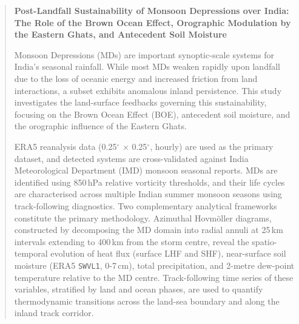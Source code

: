 \begin{abstract}
  \large \textbf{Post-Landfall Sustainability of Monsoon Depressions
    over India: \\
    The Role of the Brown Ocean Effect, %
    Orographic Modulation by the Eastern Ghats, %
  and Antecedent Soil Moisture}

  \vspace{0.5cm}

  \normalsize
  \noindent Monsoon Depressions (MDs) are important synoptic-scale
  systems for India's seasonal rainfall. While most MDs weaken
  rapidly upon landfall due to the loss of oceanic energy and
  increased friction from land interactions, a subset exhibits
  anomalous inland persistence. This study investigates the
  land-surface feedbacks governing this sustainability, focusing on
  the Brown Ocean Effect (BOE), antecedent soil moisture, and the
  orographic influence of the Eastern Ghats.

  \vspace{0.3cm}

  \noindent ERA5 reanalysis data (0.25\(^\circ\) $\times$
  0.25\(^\circ\), hourly) are used as the primary dataset, and
  detected systems are cross-validated against India Meteorological
  Department (IMD) monsoon seasonal reports. MDs are identified using
  850\,hPa relative vorticity thresholds, and their life cycles are
  characterised across multiple Indian summer monsoon seasons using
  track-following diagnostics. Two complementary analytical
  frameworks constitute the primary methodology. Azimuthal
  Hovm\"{o}ller diagrams, constructed by decomposing the MD domain
  into radial annuli at 25\,km intervals extending to 400\,km from
  the storm centre, reveal the spatio-temporal evolution of heat flux
  (surface LHF and SHF), near-surface soil moisture (ERA5
  \texttt{SWVL1}, 0-7\,cm), total precipitation, and 2-metre
  dew-point temperature relative to the MD centre. Track-following
  time series of these variables, stratified by land and ocean
  phases, are used to quantify thermodynamic transitions across the
  land-sea boundary and along the inland track corridor.


\end{abstract}
